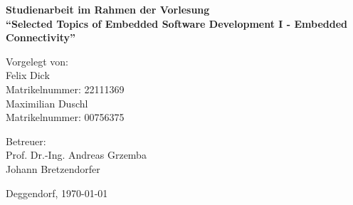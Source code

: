 \documentclass[12pt, a4paper]{article}
\begin{document}

\begin{titlepage}
    \centering
    
    
    \vspace{2cm}
    
    {\Huge\bfseries Studienarbeit im Rahmen der Vorlesung \\
    \enquote{Selected Topics of Embedded Software Development I - Embedded Connectivity}\par}
    
    \vspace{1cm}
        
    \vspace{2cm}
    
    {\large
    Vorgelegt von: \\
    \vspace{0.2cm}
    Felix Dick \\ 
    Matrikelnummer: 22111369\\ 
    Maximilian Duschl \\ 
    Matrikelnummer: 00756375\\
    \vspace{1.5cm}
    
    Betreuer: \\
    Prof. Dr.-Ing. Andreas Grzemba\\
    Johann Bretzendorfer\par} %
    
    \vfill %
    
    {\large Deggendorf, \today\par}

\end{titlepage}



\thispagestyle{empty}

\newpage

\tableofcontents
\newpage










\newpage
\printbibliography[title={References}]
\end{document}
